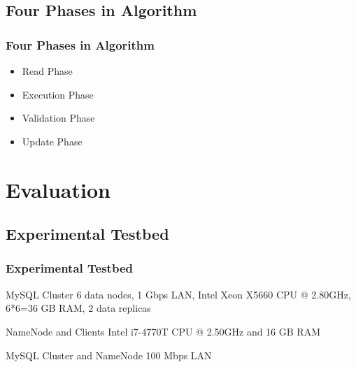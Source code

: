 \documentclass{beamer}
\begin{document}
\subsection{Four Phases in Algorithm}
\begin{frame}
	\frametitle{Four Phases in Algorithm}
	\begin{itemize}
		\item Read Phase
		\item Execution Phase
		\item Validation Phase
		\item Update Phase
	\end{itemize}
\end{frame}

\section{Evaluation}

\subsection{Experimental Testbed}
\begin{frame}
	\frametitle{Experimental Testbed}
	\begin{block}{MySQL Cluster}
		6 data nodes, 1 Gbps LAN, Intel Xeon X5660 CPU @ 2.80GHz, 6*6=36 GB RAM, 2 data replicas
	\end{block}
	\begin{block}{NameNode and Clients}
		Intel i7-4770T CPU @ 2.50GHz and 16 GB RAM
	\end{block}
	\begin{block}{MySQL Cluster and NameNode}
		100 Mbps LAN
	\end{block}
\end{frame}
\end{document}
